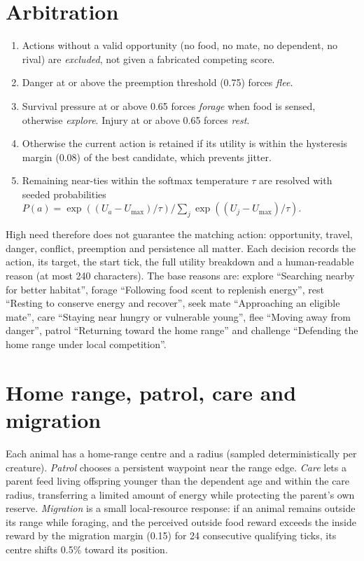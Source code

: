 \section{Arbitration}
\begin{enumerate}[leftmargin=*]
\item Actions without a valid opportunity (no food, no mate, no dependent, no
rival) are \emph{excluded}, not given a fabricated competing score.
\item Danger at or above the preemption threshold (0.75) forces \emph{flee}.
\item Survival pressure at or above 0.65 forces \emph{forage} when food is sensed,
otherwise \emph{explore}. Injury at or above 0.65 forces \emph{rest}.
\item Otherwise the current action is retained if its utility is within the
hysteresis margin (0.08) of the best candidate, which prevents jitter.
\item Remaining near-ties within the softmax temperature $\tau$ are resolved with
seeded probabilities $P(a)=\exp((U_a-U_{\max})/\tau)/\sum_j\exp((U_j-U_{\max})/\tau)$.
\end{enumerate}
High need therefore does not guarantee the matching action: opportunity, travel,
danger, conflict, preemption and persistence all matter. Each decision records the
action, its target, the start tick, the full utility breakdown and a
human-readable reason (at most 240 characters). The base reasons are: explore
``Searching nearby for better habitat'', forage ``Following food scent to replenish
energy'', rest ``Resting to conserve energy and recover'', seek mate ``Approaching an
eligible mate'', care ``Staying near hungry or vulnerable young'', flee ``Moving away
from danger'', patrol ``Returning toward the home range'' and challenge ``Defending
the home range under local competition''.

\section{Home range, patrol, care and migration}
Each animal has a home-range centre and a radius (sampled deterministically per
creature). \emph{Patrol} chooses a persistent waypoint near the range edge.
\emph{Care} lets a parent feed living offspring younger than the dependent age and
within the care radius, transferring a limited amount of energy while protecting
the parent's own reserve. \emph{Migration} is a small local-resource response: if
an animal remains outside its range while foraging, and the perceived outside food
reward exceeds the inside reward by the migration margin (0.15) for 24 consecutive
qualifying ticks, its centre shifts 0.5\% toward its position.

